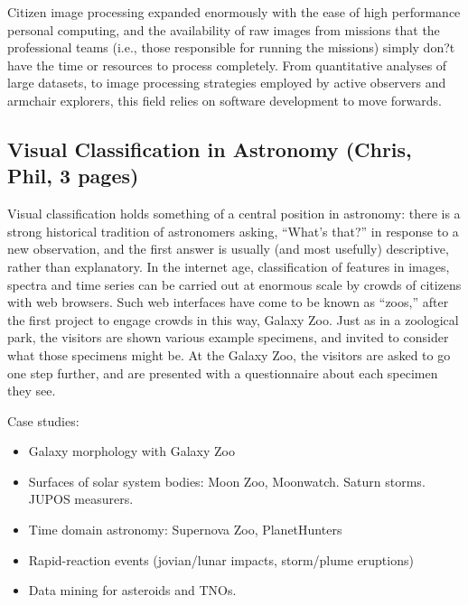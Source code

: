 \documentclass{ar2e}
\begin{document}
Citizen image processing expanded enormously with the ease of high performance
personal computing, and the availability of raw images from missions that the
professional teams (i.e., those responsible for running the missions) simply
don?t have the time or resources to process completely.  From quantitative
analyses of large datasets, to image processing strategies employed by active
observers and armchair explorers, this field relies on software development to
move forwards.



\subsection{Visual Classification in Astronomy (\textbf{Chris}, Phil, 3 pages)}
\label{sec:class:astro}

Visual classification holds something of a central position in astronomy: there
is a strong historical tradition of astronomers asking, ``What's that?'' in
response to a new observation, and the first answer is usually (and most
usefully) descriptive, rather than explanatory. In the internet age,
classification of features in images, spectra and time series can be carried out
at enormous scale by crowds of citizens with web browsers. Such web interfaces
have come to be known as ``zoos,'' after the first project to engage crowds in
this way, Galaxy Zoo. Just as in a zoological park, the visitors are shown
various example specimens, and invited to consider what those specimens might
be. At the Galaxy Zoo, the visitors are asked to go one step further, and are
presented with a questionnaire about each specimen they see.


Case studies:
\begin{itemize}
\item Galaxy morphology with Galaxy Zoo
\item Surfaces of solar system bodies: Moon Zoo, Moonwatch. Saturn storms. JUPOS
measurers.
\item Time domain astronomy: Supernova Zoo, PlanetHunters
\item Rapid-reaction events (jovian/lunar impacts, storm/plume eruptions)
\item Data mining for asteroids and TNOs.
\end{itemize}


\end{document}
